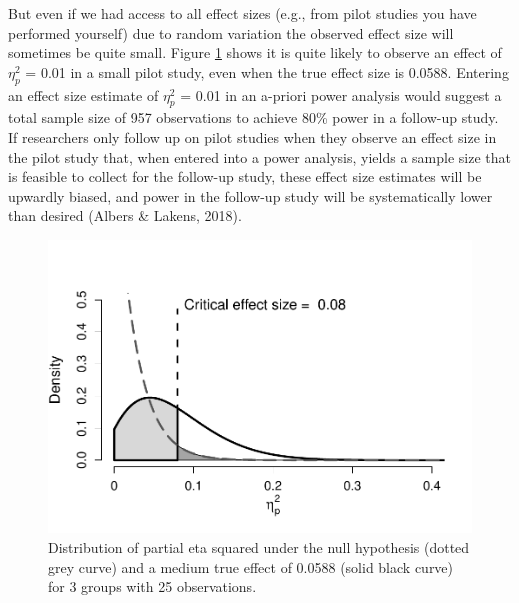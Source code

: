 \documentclass[
  english,
  ,jou, a4paper,floatsintext]{apa6}
\begin{document}
But even if we had access to all effect sizes (e.g., from pilot studies you have performed yourself) due to random variation the observed effect size will sometimes be quite small. Figure \ref{fig:follow-up-bias} shows it is quite likely to observe an effect of \(\eta_p^2\) = 0.01 in a small pilot study, even when the true effect size is 0.0588. Entering an effect size estimate of \(\eta_p^2\) = 0.01 in an a-priori power analysis would suggest a total sample size of 957 observations to achieve 80\% power in a follow-up study. If researchers only follow up on pilot studies when they observe an effect size in the pilot study that, when entered into a power analysis, yields a sample size that is feasible to collect for the follow-up study, these effect size estimates will be upwardly biased, and power in the follow-up study will be systematically lower than desired (Albers \& Lakens, 2018).

\begin{figure}
\centering
\includegraphics{sample_size_justification_files/figure-latex/follow-up-bias-1.pdf}
\caption{\label{fig:follow-up-bias}Distribution of partial eta squared under the null hypothesis (dotted grey curve) and a medium true effect of 0.0588 (solid black curve) for 3 groups with 25 observations.}
\end{figure}
\end{document}
